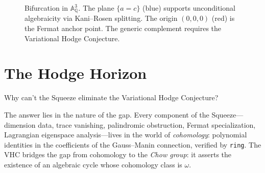 \documentclass[11pt]{article}
\theoremstyle{plain}
\theoremstyle{definition}
\theoremstyle{remark}
\newcommand{\QQ}{\mathbb{Q}}
\newcommand{\Aff}{\mathbb{A}}
\newcommand{\VHC}{\mathrm{VHC}}
\begin{document}
\begin{figure}[ht]
\centering
{}
\caption{Bifurcation in $\Aff^3_{\QQ}$.  The plane $\{a = c\}$
  (blue) supports unconditional algebraicity via Kani--Rosen
  splitting.  The origin $(0,0,0)$ (red) is the Fermat anchor
  point.  The generic complement requires the Variational Hodge
  Conjecture.}\label{fig:bifurcation}
\end{figure}


\section{The Hodge Horizon}\label{sec:horizon}

Why can't the Squeeze eliminate the Variational Hodge Conjecture?

The answer lies in the nature of the gap.  Every component of the
Squeeze---dimension data, trace vanishing, palindromic obstruction,
Fermat specialization, Lagrangian eigenspace analysis---lives in
the world of \emph{cohomology}: polynomial identities in the
coefficients of the Gauss--Manin connection, verified by
\texttt{ring}.  The VHC bridges the gap from cohomology to the
\emph{Chow group}: it asserts the existence of an algebraic cycle
whose cohomology class is $\omega$.
\end{document}
